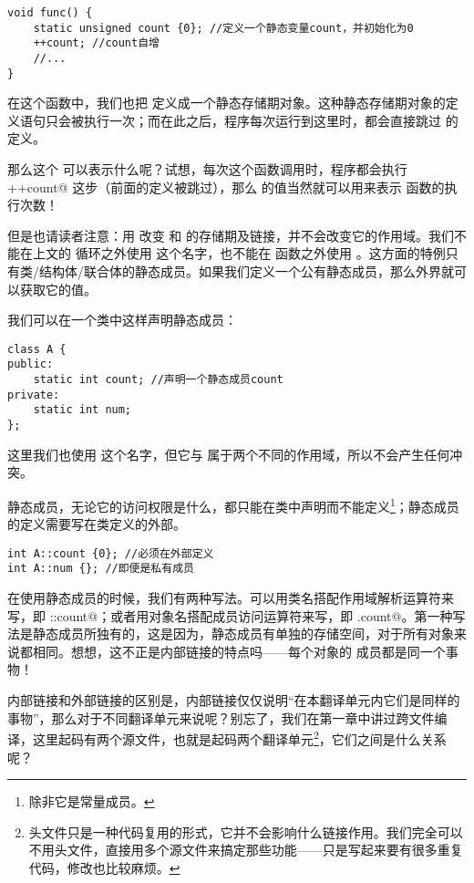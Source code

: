 \begin{lstlisting}
void func() {
    static unsigned count {0}; //定义一个静态变量count，并初始化为0
    ++count; //count自增
    //...
}
\end{lstlisting}
在这个函数中，我们也把 \lstinline@count@ 定义成一个静态存储期对象。这种静态存储期对象的定义语句只会被执行一次；而在此之后，程序每次运行到这里时，都会直接跳过 \lstinline@count@ 的定义。\par
那么这个 \lstinline@count@ 可以表示什么呢？试想，每次这个函数调用时，程序都会执行 \lstinline@++count@ 这步（前面的定义被跳过），那么 \lstinline@count@ 的值当然就可以用来表示 \lstinline@func@ 函数的执行次数！\par
但是也请读者注意：用 \lstinline@static@ 改变 \lstinline@x@ 和 \lstinline@count@ 的存储期及链接，并不会改变它的作用域。我们不能在上文的 \lstinline@for@ 循环之外使用 \lstinline@x@ 这个名字，也不能在 \lstinline@func@ 函数之外使用 \lstinline@count@。这方面的特例只有类/结构体/联合体的静态成员。如果我们定义一个公有静态成员，那么外界就可以获取它的值。\par
我们可以在一个类中这样声明静态成员：
\begin{lstlisting}
class A {
public:
    static int count; //声明一个静态成员count
private:
    static int num;
};
\end{lstlisting}
这里我们也使用 \lstinline@count@ 这个名字，但它与 \lstinline@func@ 属于两个不同的作用域，所以不会产生任何冲突。\par
静态成员，无论它的访问权限是什么，都只能在类中声明而不能定义\footnote{除非它是常量成员。}；静态成员的定义需要写在类定义的外部。
\begin{lstlisting}
int A::count {0}; //必须在外部定义
int A::num {}; //即便是私有成员
\end{lstlisting}
在使用静态成员的时候，我们有两种写法。可以用类名搭配作用域解析运算符来写，即 \lstinline@A::count@；或者用对象名搭配成员访问运算符来写，即 \lstinline@a.count@。第一种写法是静态成员所独有的，这是因为，静态成员有单独的存储空间，对于所有对象来说都相同。想想，这不正是内部链接的特点吗——每个对象的 \lstinline@count@ 成员都是同一个事物！\par
内部链接和外部链接的区别是，内部链接仅仅说明``在本翻译单元内它们是同样的事物''，那么对于不同翻译单元来说呢？别忘了，我们在第一章中讲过跨文件编译，这里起码有两个源文件，也就是起码两个翻译单元\footnote{头文件只是一种代码复用的形式，它并不会影响什么链接作用。我们完全可以不用头文件，直接用多个源文件来搞定那些功能——只是写起来要有很多重复代码，修改也比较麻烦。}，它们之间是什么关系呢？\par
